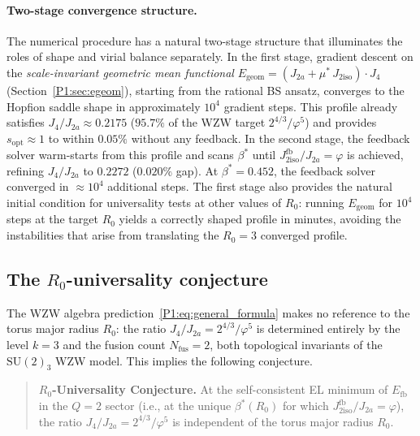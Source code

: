 \documentclass[11pt,a4paper]{article}
\theoremstyle{definition}
\theoremstyle{remark}
\newcommand{\vp}{\varphi}
\newcommand{\ms}{\mu^{*}}
\newcommand{\bst}{\beta^{*}}
\newcommand{\Efb}{E_{\mathrm{fb}}}
\newcommand{\Jfb}{J_{2\mathrm{iso}}^{\mathrm{fb}}}
\newcommand{\Ja}{J_{2a}}
\newcommand{\Jiso}{J_{2\mathrm{iso}}}
\newcommand{\Jfour}{J_{4}}
\begin{document}
\paragraph{Two-stage convergence structure.}
The numerical procedure has a natural two-stage structure that
illuminates the roles of shape and virial balance separately.
In the first stage, gradient descent on the
\emph{scale-invariant geometric mean functional}
$E_{\mathrm{geom}} = (\Ja + \ms\,\Jiso)\cdot\Jfour$
(Section~\ref{P1:sec:egeom}), starting from the rational BS ansatz,
converges to the Hopfion saddle shape in approximately
$10^4$ gradient steps. This profile already satisfies 
$\Jfour/\Ja \approx 0.2175$
($95.7\%$ of the WZW target $2^{4/3}/\vp^5$) and provides
$s_{\mathrm{opt}}\approx 1$ to within $0.05\%$ without any
feedback.  In the second stage, the feedback solver warm-starts from this profile
and scans $\bst$ until $\Jfb/\Ja = \vp$ is achieved,
refining $\Jfour/\Ja$ to $0.2272$ ($0.020\%$ gap).
At $\bst = 0.452$, the feedback solver converged in
$\approx 10^4$ additional steps. The first stage also provides the natural initial condition
for universality tests at other values of $R_0$: running
$E_{\mathrm{geom}}$ for $10^4$ steps at the target $R_0$ yields a
correctly shaped profile in minutes, avoiding the instabilities
that arise from translating the $R_0=3$ converged profile.

\subsection{The $R_0$-universality conjecture}
\label{P1:sec:universality}

The WZW algebra prediction~\eqref{P1:eq:general_formula} makes no reference
to the torus major radius $R_0$: the ratio $\Jfour/\Ja = 2^{4/3}/\vp^5$
is determined entirely by the level $k=3$ and the fusion count $N_{\mathrm{fus}}=2$,
both topological invariants of the $\mathrm{SU}(2)_3$ WZW model.
This implies the following conjecture.

\begin{quote}
\textbf{$R_0$-Universality Conjecture.}
At the self-consistent EL minimum of $\Efb$ in the $Q=2$ sector
(i.e., at the unique $\bst(R_0)$ for which $\Jfb/\Ja=\vp$),
the ratio $\Jfour/\Ja = 2^{4/3}/\vp^5$ is independent of the torus
major radius $R_0$.
\end{quote}
\end{document}
